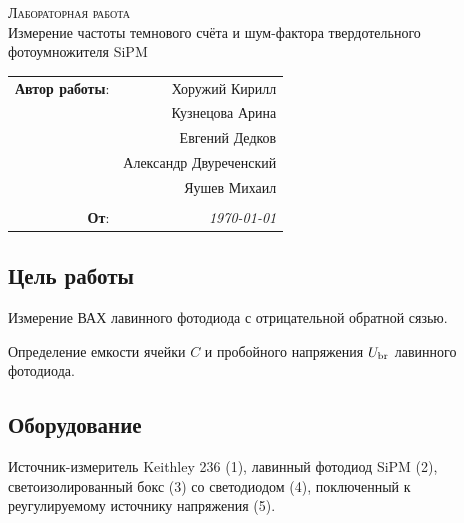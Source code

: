 
\phantom{42}
\vspace{20mm}

\begin{center}
    \LARGE \textsc{Лабораторная работа} \\
    \vspace{3 mm}
    \large Измерение частоты темнового счёта и шум-фактора твердотельного фотоумножителя SiPM
\end{center}


\phantom{42}

\begin{flushright}
    \begin{tabular}{rr}
        \textbf{Автор работы}: 
        & Хоружий Кирилл \\ 
        & Кузнецова Арина \\
        & Евгений Дедков \\
        & Александр Двуреченский \\
        & Яушев Михаил  \\ 
        & \\
        \textbf{От}: &
        \textit{\today}\\
    \end{tabular}
\end{flushright}

\thispagestyle{empty}

\vspace{10mm}


\subsection*{Цель работы}
\begin{enumerate*}
    \item Измерение ВАХ лавинного фотодиода с отрицательной обратной сязью.
    \item Определение емкости ячейки $C$ и пробойного напряжения $U_{\textnormal{br}}$ лавинного фотодиода.
\end{enumerate*}


\subsection*{Оборудование}
Источник-измеритель Keithley 236 (1), 
лавинный фотодиод SiPM (2), 
светоизолированный бокс (3) со светодиодом (4), поключенный к реугулируемому источнику напряжения (5).

